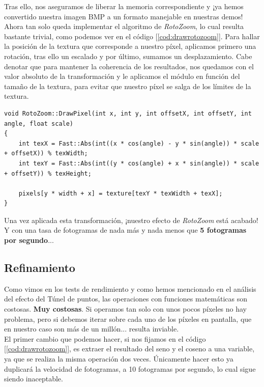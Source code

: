 Tras ello, nos aseguramos de liberar la memoria correspondiente y ¡ya hemos convertido nuestra imagen BMP a un formato manejable en nuestras demos!\\

Ahora tan solo queda implementar el algoritmo de \emph{RotoZoom}, lo cual resulta bastante trivial, como podemos ver en el código [\ref{cod:drawrotozoom}]. Para hallar la posición de la textura que corresponde a nuestro píxel, aplicamos primero una rotación, tras ello un escalado y por último, sumamos un desplazamiento. Cabe denotar que para mantener la coherencia de los resultados, nos quedamos con el valor absoluto de la transformación y le aplicamos el módulo en función del tamaño de la textura, para evitar que nuestro píxel se salga de los límites de la textura.\\

\begin{lstlisting}[style=C-color, caption={Dibujar un píxel cuya textura se desplaza en función de un ángulo, una escala y una traslación}, label=cod:drawrotozoom]
void RotoZoom::DrawPixel(int x, int y, int offsetX, int offsetY, int angle, float scale)
{
    int texX = Fast::Abs(int((x * cos(angle) - y * sin(angle)) * scale + offsetX)) % texWidth;
    int texY = Fast::Abs(int((y * cos(angle) + x * sin(angle)) * scale + offsetY)) % texHeight;

    pixels[y * width + x] = texture[texY * texWidth + texX];
}
\end{lstlisting}

Una vez aplicada esta transformación, ¡nuestro efecto de \emph{RotoZoom} está acabado! Y con una tasa de fotogramas de nada más y nada menos que \textbf{5 fotogramas por segundo}...

\subsection{Refinamiento}

Como vimos en los tests de rendimiento y como hemos mencionado en el análisis del efecto del Túnel de puntos, las operaciones con funciones matemáticas son costosas. \textbf{Muy costosas}. Si operamos tan solo con unos pocos píxeles no hay problema, pero si debemos iterar sobre cada uno de los píxeles en pantalla, que en nuestro caso son más de un millón... resulta inviable.\\

El primer cambio que podemos hacer, si nos fijamos en el código [\ref{cod:drawrotozoom}], es extraer el resultado del seno y el coseno a una variable, ya que se realiza la misma operación dos veces. Únicamente hacer esto ya duplicará la velocidad de fotogramas, a 10 fotogramas por segundo, lo cual sigue siendo inaceptable.\\

